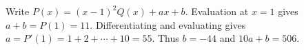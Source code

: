 Write $P(x)=(x-1)^2Q(x)+ax+b$. Evaluation at $x=1$ gives $a+b=P(1)=11$. Differentiating and evaluating gives $a=P'(1)=1+2+\cdots+10=55$. Thus $b=-44$ and $\boxed{10a+b=506}$.

